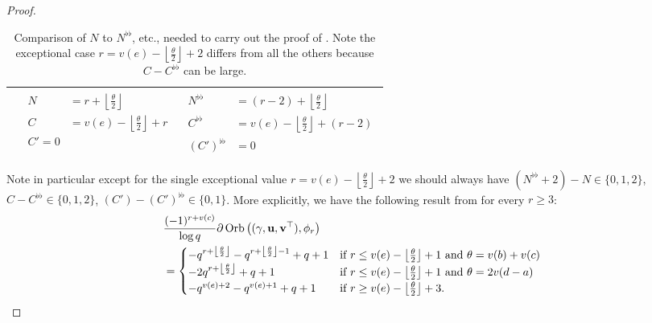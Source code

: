 \begin{proof}
\begin{table}
\begin{tabular}{lll}
        & $\begin{aligned} N &= r + \left\lfloor \tfrac{\theta}{2} \right\rfloor \\
          C &= v(e) - \left\lfloor \tfrac{\theta}{2} \right\rfloor + r \\
          C' = 0 \end{aligned}$
        & $\begin{aligned} N^{\flat\flat} &= (r-2) + \left\lfloor \tfrac{\theta}{2} \right\rfloor \\
          C^{\flat\flat} &= v(e) - \left\lfloor \tfrac{\theta}{2} \right\rfloor + (r-2) \\
          (C')^{\flat\flat} &= 0 \end{aligned}$ \\
      \bottomrule
    \end{tabular}
    \caption{Comparison of $N$ to $N^{\flat\flat}$, etc.,
      needed to carry out the proof of .
      Note the exceptional case $r = v(e) - \left\lfloor \frac{\theta}{2} \right\rfloor + 2$
      differs from all the others because $C-C^{\flat\flat}$ can be large.}
    \label{tab:semi_lie_change_by_two}
  \end{table}
  Note in particular except for the single exceptional value
  $r = v(e) - \left\lfloor \frac{\theta}{2} \right\rfloor + 2$
  we should always have $(N^{\flat\flat}+2)-N \in \{0,1,2\}$,
  $C - C^{\flat\flat} \in \{0,1,2\}$, $(C') - (C')^{\flat\flat} \in \{0,1\}$.
  More explicitly, we have the following result from 
  for every $r \ge 3$:
  \begin{align*}
    &\frac{(-1)^{r+v(c)}}{\log q}
    \partial \operatorname{Orb} \left( {(\gamma, \mathbf u, \mathbf v^\top)}, \phi_r \right) \\
    &=
    \begin{cases}
      -q^{r+\left\lfloor \frac{\theta}{2} \right\rfloor} -q^{r+\left\lfloor \frac{\theta}{2} \right\rfloor - 1} + q + 1
        & \text{if } r \le v(e) - \left\lfloor \frac{\theta}{2} \right\rfloor + 1 \text{ and } \theta = v(b)+v(c) \\
      -2q^{r+\left\lfloor \frac{\theta}{2} \right\rfloor} + q + 1 & \text{if } r \le v(e) - \left\lfloor \frac{\theta}{2} \right\rfloor + 1 \text{ and } \theta = 2v(d-a) \\
      -q^{v(e)+2} - q^{v(e)+1} + q + 1  & \text{if } r \ge v(e) - \left\lfloor \frac{\theta}{2} \right\rfloor + 3.
    \end{cases}
  \end{align*}

\end{proof}
